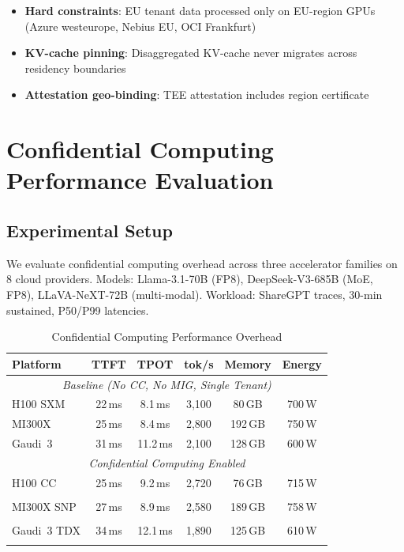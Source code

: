\documentclass[conference,10pt]{IEEEtran}
\begin{document}
\begin{itemize}
\item \textbf{Hard constraints}: EU tenant data processed only on EU-region GPUs (Azure westeurope, Nebius EU, OCI Frankfurt)
\item \textbf{KV-cache pinning}: Disaggregated KV-cache never migrates across residency boundaries
\item \textbf{Attestation geo-binding}: TEE attestation includes region certificate
\end{itemize}

\section{Confidential Computing Performance Evaluation}
\label{sec:cc}

\subsection{Experimental Setup}

We evaluate confidential computing overhead across three accelerator families on 8 cloud providers. Models: Llama-3.1-70B (FP8), DeepSeek-V3-685B (MoE, FP8), LLaVA-NeXT-72B (multi-modal). Workload: ShareGPT traces, 30-min sustained, P50/P99 latencies.

\begin{table}[!htbp]
\caption{Confidential Computing Performance Overhead}
\label{tab:ccperf}
\centering\footnotesize
\begin{tabular}{@{}lccccc@{}}
\toprule
\textbf{Platform} & \textbf{TTFT} & \textbf{TPOT} & \textbf{tok/s} & \textbf{Memory} & \textbf{Energy} \\
\midrule
\multicolumn{6}{c}{\textit{Baseline (No CC, No MIG, Single Tenant)}} \\
\midrule
H100 SXM & 22\,ms & 8.1\,ms & 3,100 & 80\,GB & 700\,W \\
MI300X & 25\,ms & 8.4\,ms & 2,800 & 192\,GB & 750\,W \\
Gaudi~3 & 31\,ms & 11.2\,ms & 2,100 & 128\,GB & 600\,W \\
\midrule
\multicolumn{6}{c}{\textit{Confidential Computing Enabled}} \\
\midrule
H100 CC & 25\,ms & 9.2\,ms & 2,720 & 76\,GB & 715\,W \\
 & \color{t4}{+14\%} & \color{t4}{+14\%} & \color{t4}{-12\%} & \color{t4}{-5\%} & \color{t4}{+2\%} \\
MI300X SNP & 27\,ms & 8.9\,ms & 2,580 & 189\,GB & 758\,W \\
 & \color{sec}{+8\%} & \color{sec}{+6\%} & \color{sec}{-8\%} & \color{sec}{-2\%} & \color{sec}{+1\%} \\
Gaudi~3 TDX & 34\,ms & 12.1\,ms & 1,890 & 125\,GB & 610\,W \\
 & \color{t3}{+10\%} & \color{t3}{+8\%} & \color{t3}{-10\%} & \color{t3}{-2\%} & \color{t3}{+2\%} \\
\bottomrule
\end{tabular}
\end{table}
\end{document}
